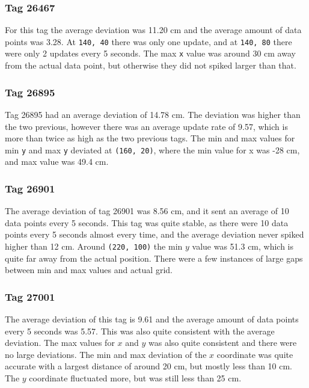 \subsubsection{Tag 26467}
For this tag the average deviation was 11.20 cm and the average amount of data points was 3.28.
At \texttt{140, 40} there was only one update, and at \texttt{140, 80} there were only 2 updates every 5 seconds.
The max \texttt{x} value was around 30 cm away from the actual data point, but otherwise they did not spiked larger than that.

\subsubsection{Tag 26895}
Tag 26895 had an average deviation of 14.78 cm. 
The deviation was higher than the two previous, however there was an average update rate of 9.57, which is more than twice as high as the two previous tags.
The min and max values for min \texttt{y} and max \texttt{y} deviated at \texttt{(160, 20)}, where the min value for x was -28 cm, and max value was 49.4 cm.

\subsubsection{Tag 26901}
The average deviation of tag 26901 was 8.56 cm, and it sent an average of 10 data points every 5 seconds.
This tag was quite stable, as there were 10 data points every 5 seconds almost every time, and the average deviation never spiked higher than 12 cm.
Around \texttt{(220, 100)} the min $y$ value was 51.3 cm, which is quite far away from the actual position.
There were a few instances of large gaps between min and max values and actual grid.

\subsubsection{Tag 27001}
The average deviation of this tag is 9.61 and the average amount of data points every 5 seconds was 5.57.
This was also quite consistent with the average deviation. 
The max values for $x$ and $y$ was also quite consistent and there were no large deviations.
The min and max deviation of the $x$ coordinate was quite accurate with a largest distance of around 20 cm, but mostly less than 10 cm.
The $y$ coordinate fluctuated more, but was still less than 25 cm.

